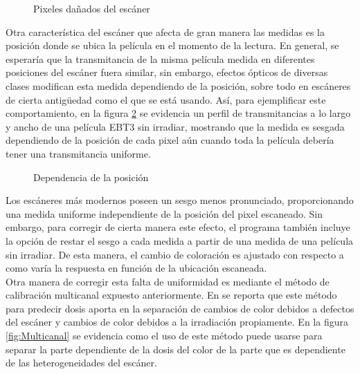 \begin{figure}
	\centering
	
	\caption{Pixeles dañados del escáner}
	\label{fig:pixelesDanados}
\end{figure}

Otra característica del escáner que afecta de gran manera las medidas es la posición donde se ubica la película en el momento de la lectura. En general, se esperaría que la transmitancia de la misma película medida en diferentes posiciones del escáner fuera similar, sin embargo, efectos ópticos de diversas clases modifican esta medida dependiendo de la posición, sobre todo en escáneres de cierta antigüedad como el que se está usando. Así, para ejemplificar este comportamiento, en la figura \ref{fig:dependeciaDePosicion} se evidencia un perfil de transmitancias a lo largo y ancho de una película EBT3 sin irradiar, mostrando que la medida es sesgada dependiendo de la posición de cada pixel aún cuando toda la película debería tener una transmitancia uniforme. \\
\begin{figure}
	\centering
	
	\caption{Dependencia de la posición}
	\label{fig:dependeciaDePosicion}
\end{figure}

Los escáneres más modernos poseen un sesgo menos pronunciado, proporcionando una medida uniforme independiente de la posición del pixel escaneado. Sin embargo, para corregir de cierta manera este efecto, el programa también incluye la opción de restar el sesgo a cada medida a partir de una medida de una película sin irradiar. De esta manera, el cambio de coloración es ajustado con respecto a como varía la respuesta en función de la ubicación escaneada. \\

Otra manera de corregir esta falta de uniformidad es mediante el método de calibración multicanal expuesto anteriormente. En \cite{Micke2011} se reporta que este método para predecir dosis aporta en la separación de cambios de color debidos a defectos del escáner y cambios de color debidos a la irradiación propiamente. En la figura \ref{fig:Multicanal} se evidencia como el uso de este método puede usarse para separar la parte dependiente de la dosis del color de la parte que es dependiente de las heterogeneidades del escáner. \\

